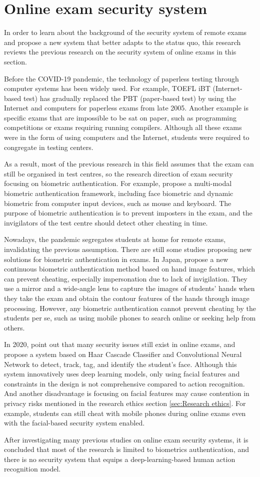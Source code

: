 \section{Online exam security system}
\label{sec:Online exam security system}
In order to learn about the background of the security system of remote exams and propose a new system that better adapts to the status quo, this research reviews the previous research on the security system of online exams in this section.

Before the COVID-19 pandemic, the technology of paperless testing through computer systems has been widely used. For example, TOEFL iBT (Internet-based test) has gradually replaced the PBT (paper-based test) by using the Internet and computers for paperless exams from late 2005.
Another example is specific exams that are impossible to be sat on paper, such as programming competitions or exams requiring running compilers.
Although all these exams were in the form of using computers and the Internet, students were required to congregate in testing centers.

As a result, most of the previous research in this field assumes that the exam can still be organised in test centres, so the research direction of exam security focusing on biometric authentication. For example, \citet{traore2017ensuring} propose a multi-modal biometric authentication framework, including face biometric and dynamic biometric from computer input devices, such as mouse and keyboard. The purpose of biometric authentication is to prevent imposters in the exam, and the invigilators of the test centre should detect other cheating in time.

Nowadays, the pandemic segregates students at home for remote exams, invalidating the previous assumption. There are still some studies proposing new solutions for biometric authentication in exams. 
In Japan, \citet{Akiko202144107} propose a new continuous biometric authentication method based on hand image features, which can prevent cheating, especially impersonation due to lack of invigilation. 
They use a mirror and a wide-angle lens to capture the images of students' hands when they take the exam and obtain the contour features of the hands through image processing.
However, any biometric authentication cannot prevent cheating by the students per se, such as using mobile phones to search online or seeking help from others.

In 2020, \citet{garg2020convolutional} point out that many security issues still exist in online exams, and propose a system based on Haar Cascade Classifier and Convolutional Neural Network to detect, track, tag, and identify the student's face.
Although this system innovatively uses deep learning models, only using facial features and constraints in the design is not comprehensive compared to action recognition.
And another disadvantage is focusing on facial features may cause contention in privacy risks mentioned in the research ethics section \ref{sec:Research ethics}.
For example, students can still cheat with mobile phones during online exams even with the facial-based security system enabled.

After investigating many previous studies on online exam security systems, it is concluded that most of the research is limited to biometrics authentication, and there is no security system that equips a deep-learning-based human action recognition model.